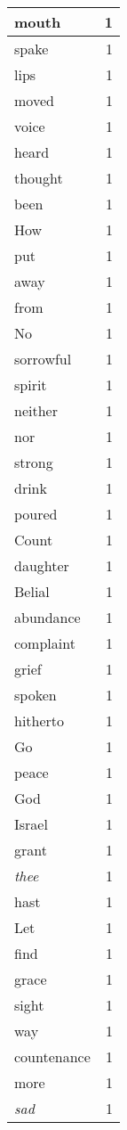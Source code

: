 \begin{center}
\begin{longtable}{l|r}
mouth & 1 \\ \hline
spake & 1 \\ \hline
lips & 1 \\ \hline
moved & 1 \\ \hline
voice & 1 \\ \hline
heard & 1 \\ \hline
thought & 1 \\ \hline
been & 1 \\ \hline
How & 1 \\ \hline
put & 1 \\ \hline
away & 1 \\ \hline
from & 1 \\ \hline
No & 1 \\ \hline
sorrowful & 1 \\ \hline
spirit & 1 \\ \hline
neither & 1 \\ \hline
nor & 1 \\ \hline
strong & 1 \\ \hline
drink & 1 \\ \hline
poured & 1 \\ \hline
Count & 1 \\ \hline
daughter & 1 \\ \hline
Belial & 1 \\ \hline
abundance & 1 \\ \hline
complaint & 1 \\ \hline
grief & 1 \\ \hline
spoken & 1 \\ \hline
hitherto & 1 \\ \hline
Go & 1 \\ \hline
peace & 1 \\ \hline
God & 1 \\ \hline
Israel & 1 \\ \hline
grant & 1 \\ \hline
\emph{thee} & 1 \\ \hline
hast & 1 \\ \hline
Let & 1 \\ \hline
find & 1 \\ \hline
grace & 1 \\ \hline
sight & 1 \\ \hline
way & 1 \\ \hline
countenance & 1 \\ \hline
more & 1 \\ \hline
\emph{sad} & 1 \\ \hline

\end{longtable}
\end{center}
